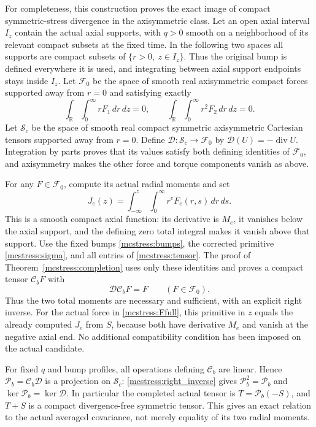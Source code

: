For completeness, this construction proves the exact image of compact
symmetric-stress divergence in the axisymmetric class. Let
an open axial interval $I_z$ contain the actual axial supports, with
$q>0$ smooth on a neighborhood of its relevant compact subsets at the
fixed time. In the following two spaces all supports are compact
subsets of $\{r>0,\ z\in I_z\}$. Thus the original bump is defined
everywhere it is used, and integrating between axial support endpoints
stays inside $I_z$.
Let
$\mathcal F_0$ be the space of smooth real axisymmetric compact forces
supported away from $r=0$ and satisfying exactly
\[
 \int_{\mathbb R}\int_0^\infty rF_1\,dr\,dz=0,
 \qquad
 \int_{\mathbb R}\int_0^\infty r^2F_2\,dr\,dz=0.
\]
Let $\mathcal S_c$ be the space of smooth real compact symmetric
axisymmetric Cartesian tensors supported away from $r=0$. Define
$\mathcal D:\mathcal S_c\to\mathcal F_0$ by
$\mathcal D(U)=-\operatorname{div}U$.
Integration by parts proves that its values satisfy both defining
identities of $\mathcal F_0$, and axisymmetry makes the other force
and torque components vanish as above.

For any $F\in\mathcal F_0$, compute its actual radial moments and set
\[
 J_e(z)=\int_{-\infty}^z\int_0^\infty r^eF_e(r,s)\,dr\,ds.
\]
This is a smooth compact axial function: its derivative is $M_e$, it
vanishes below the axial support, and the defining zero total integral
makes it vanish above that support. Use the fixed bumps
\eqref{mcstress:bumps}, the corrected primitive
\eqref{mcstress:sigma}, and all entries of
\eqref{mcstress:tensor}. The proof of Theorem~\ref{mcstress:completion}
uses only these identities and proves a compact tensor
$\mathcal C_bF$ with
\begin{equation}\label{mcstress:right_inverse}
 \mathcal D\mathcal C_bF=F\qquad(F\in\mathcal F_0).
\end{equation}
Thus the two total moments are necessary and sufficient, with an
explicit right inverse. For the actual force in
\eqref{mcstress:Ffull}, this primitive in $z$ equals the already
computed $J_e$ from $S$, because both have derivative $M_e$ and vanish
at the negative axial end. No additional compatibility condition has
been imposed on the actual candidate.

For fixed $q$ and bump profiles, all operations defining
$\mathcal C_b$ are linear. Hence
$\mathcal P_b=\mathcal C_b\mathcal D$ is a projection on
$\mathcal S_c$: \eqref{mcstress:right_inverse} gives
$\mathcal P_b^2=\mathcal P_b$ and
$\ker\mathcal P_b=\ker\mathcal D$.
In particular the completed actual tensor is
$T=\mathcal P_b(-S)$, and $T+S$ is a compact divergence-free symmetric
tensor. This gives an exact relation to the actual averaged covariance,
not merely equality of its two radial moments.

